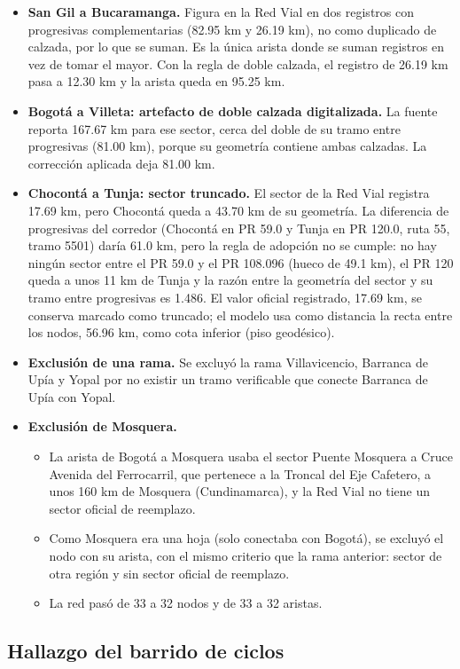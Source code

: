 \documentclass[12pt,a4paper]{article}
\begin{document}
\begin{itemize}
\item \textbf{San Gil a Bucaramanga.} Figura en la Red Vial en dos registros
con progresivas complementarias (82.95 km y 26.19 km), no como duplicado de
calzada, por lo que se suman. Es la única arista donde se suman registros en
vez de tomar el mayor. Con la regla de doble calzada, el registro de 26.19 km
pasa a 12.30 km y la arista queda en 95.25 km.
\item \textbf{Bogotá a Villeta: artefacto de doble calzada digitalizada.} La
fuente reporta 167.67 km para ese sector, cerca del doble de su tramo entre
progresivas (81.00 km), porque su geometría contiene ambas calzadas. La
corrección aplicada deja 81.00 km.
\item \textbf{Chocontá a Tunja: sector truncado.} El sector de la Red Vial
registra 17.69 km, pero Chocontá queda a 43.70 km de su geometría. La
diferencia de progresivas del corredor (Chocontá en PR 59.0 y Tunja en PR
120.0, ruta 55, tramo 5501) daría 61.0 km, pero la regla de adopción no se
cumple: no hay ningún sector entre el PR 59.0 y el PR 108.096 (hueco de 49.1
km), el PR 120 queda a unos 11 km de Tunja y la razón entre la geometría del
sector y su tramo entre progresivas es 1.486. El valor oficial registrado, 17.69
km, se conserva marcado como truncado; el modelo usa como distancia la recta
entre los nodos, 56.96 km, como cota inferior (piso geodésico).
\item \textbf{Exclusión de una rama.} Se excluyó la rama Villavicencio,
Barranca de Upía y Yopal por no existir un tramo verificable que conecte
Barranca de Upía con Yopal.
\item \textbf{Exclusión de Mosquera.}
\begin{itemize}
\item La arista de Bogotá a Mosquera usaba el sector Puente Mosquera a Cruce
Avenida del Ferrocarril, que pertenece a la Troncal del Eje Cafetero, a unos
160 km de Mosquera (Cundinamarca), y la Red Vial no tiene un sector oficial de
reemplazo.
\item Como Mosquera era una hoja (solo conectaba con Bogotá), se excluyó el
nodo con su arista, con el mismo criterio que la rama anterior: sector de otra
región y sin sector oficial de reemplazo.
\item La red pasó de 33 a 32 nodos y de 33 a 32 aristas.
\end{itemize}
\end{itemize}

\subsection{Hallazgo del barrido de ciclos}
\end{document}
